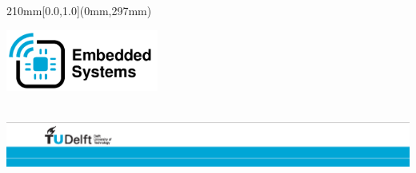 \begin {textblock*}{210mm}[0.0,1.0](0mm,297mm)
\noindent
\hspace{1.89cm}

\hfill\parbox{5cm}{
\includegraphics[width=5cm]{template-pics/tud-es-logo-tikz/tud-es-logo}} %
\hspace*{2cm}\\

\vspace*{1.5cm}
\noindent
\includegraphics[width=\textwidth]{template-pics/TU_border_A4_L_front} %
\end{textblock*}

\null\newpage